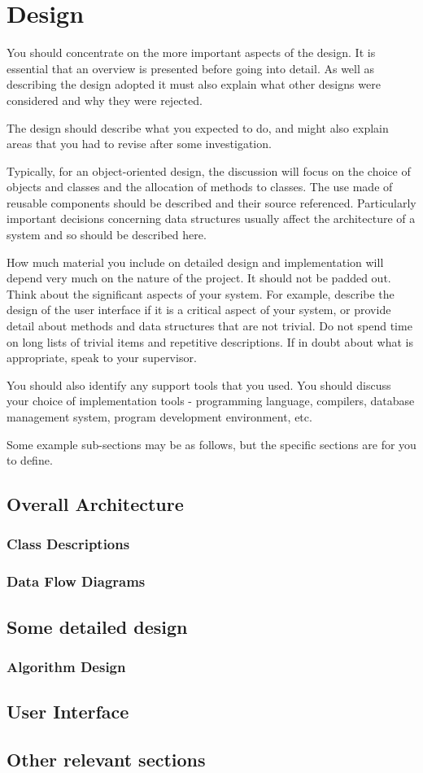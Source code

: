 \chapter{Design}

You should concentrate on the more important aspects of the design. It is essential that an overview is presented before going into detail. As well as describing the design adopted it must also explain what other designs were considered and why they were rejected.

The design should describe what you expected to do, and might also explain areas that you had to revise after some investigation.

Typically, for an object-oriented design, the discussion will focus on the choice of objects and classes and the allocation of methods to classes. The use made of reusable components should be described and their source referenced. Particularly important decisions concerning data structures usually affect the architecture of a system and so should be described here.

How much material you include on detailed design and implementation will depend very much on the nature of the project. It should not be padded out. Think about the significant aspects of your system. For example, describe the design of the user interface if it is a critical aspect of your system, or provide detail about methods and data structures that are not trivial. Do not spend time on long lists of trivial items and repetitive descriptions. If in doubt about what is appropriate, speak to your supervisor.
 
You should also identify any support tools that you used. You should discuss your choice of implementation tools - programming language, compilers, database management system, program development environment, etc.

Some example sub-sections may be as follows, but the specific sections are for you to define. 

\section{Overall Architecture}
\subsection{Class Descriptions}
\subsection{Data Flow Diagrams}
\section{Some detailed design}
\subsection{Algorithm Design}
\section{User Interface}

\section{Other relevant sections}